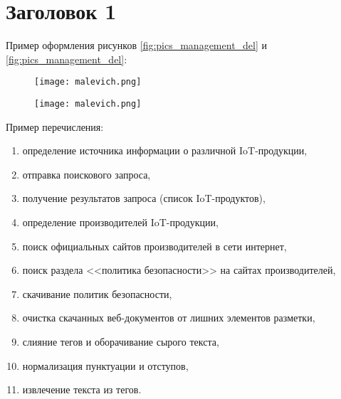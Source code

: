 \documentclass[../main]{subfiles}
\begin{document}
\newpage
\section{Заголовок 1}
\label{sec:subject_domain}

Пример оформления рисунков \ref{fig:pics_management_del} и \ref{fig:pics_management_del}:

\begin{figure}[H]
    \centering
    {\texttt{[image: malevich.png]}}
    \vspace{-\baselineskip}
\end{figure}

\begin{figure}[H]
    \centering
    {\texttt{[image: malevich.png]}}
    \vspace{-\baselineskip}
\end{figure}

Пример перечисления:
\begin{enumerate}
    \item определение источника информации о различной IoT-продукции,
    \item отправка поискового запроса,
    \item получение результатов запроса (список IoT-продуктов),
    \item определение производителей IoT-продукции,
    \item поиск официальных сайтов производителей в сети интернет,
    \item поиск раздела <<политика безопасности>> на сайтах производителей,
    \item скачивание политик безопасности,
    \item очистка скачанных веб-документов от лишних элементов разметки,
    \item слияние тегов и оборачивание сырого текста,
    \item нормализация пунктуации и отступов,
    \item извлечение текста из тегов.
\end{enumerate}
\end{document}
